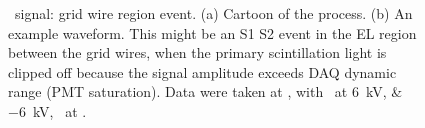 \begin{figure}[!htbp]
\begin{subfigure}[b]{0.7\textwidth}
		\caption{}
		\label{fig:}
	\end{subfigure}
	\caption[\gtest\ signal: grid wire region event.]{\gtest\ signal: grid wire region event. (a) Cartoon of the process. (b) An example waveform. This might be an S1 S2 event in the EL region between the grid wires, when the primary scintillation light is clipped off because the signal amplitude exceeds DAQ dynamic range (PMT saturation). Data were taken at , with \opvtvb\ at \SIlist{+6;-6}{kV}, \opgd\ at \standarddensity .%
	}
	\label{fig:grid wire rad}
\end{figure}

